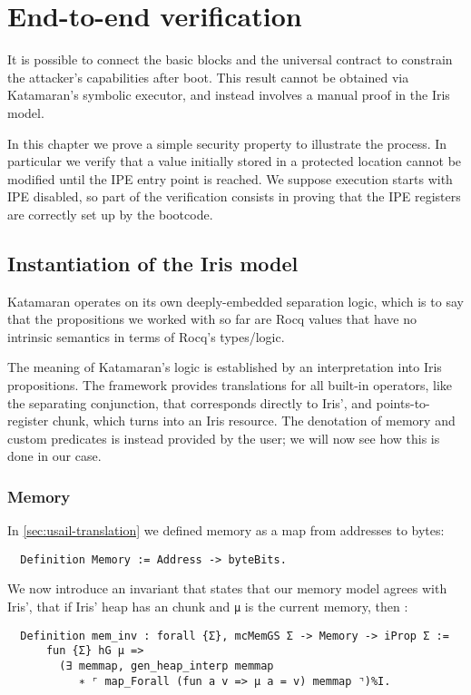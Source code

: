 \chapter{End-to-end verification}

It is possible to connect the basic blocks and the universal contract to constrain the attacker's capabilities after boot. This result cannot be obtained via Katamaran's symbolic executor, and instead involves a manual proof in the Iris model.

In this chapter we prove a simple security property to illustrate the process. In particular we verify that a value initially stored in a protected location cannot be modified until the IPE entry point is reached. We suppose execution starts with IPE disabled, so part of the verification consists in proving that the IPE registers are correctly set up by the bootcode.

\section{Instantiation of the Iris model}

Katamaran operates on its own deeply-embedded separation logic, which is to say that the propositions we worked with so far are Rocq values that have no intrinsic semantics in terms of Rocq's types/logic.

The meaning of Katamaran's logic is established by an interpretation into Iris propositions. The framework provides translations for all built-in operators, like the separating conjunction, that corresponds directly to Iris', and points-to-register chunk, which turns into an Iris resource. The denotation of memory and custom predicates is instead provided by the user; we will now see how this is done in our case.

\subsection{Memory}

In \cref{sec:usail-translation} we defined memory as a map from addresses to bytes:
\begin{verbatim}
  Definition Memory := Address -> byteBits.
\end{verbatim}
We now introduce an invariant that states that our memory model agrees with Iris', \ie that if Iris' heap has an  chunk and \texttt{\small μ} is the current memory, then :
\begin{verbatim}
  Definition mem_inv : forall {Σ}, mcMemGS Σ -> Memory -> iProp Σ :=
      fun {Σ} hG μ =>
        (∃ memmap, gen_heap_interp memmap
           ∗ ⌜ map_Forall (fun a v => μ a = v) memmap ⌝)%I.
\end{verbatim}

